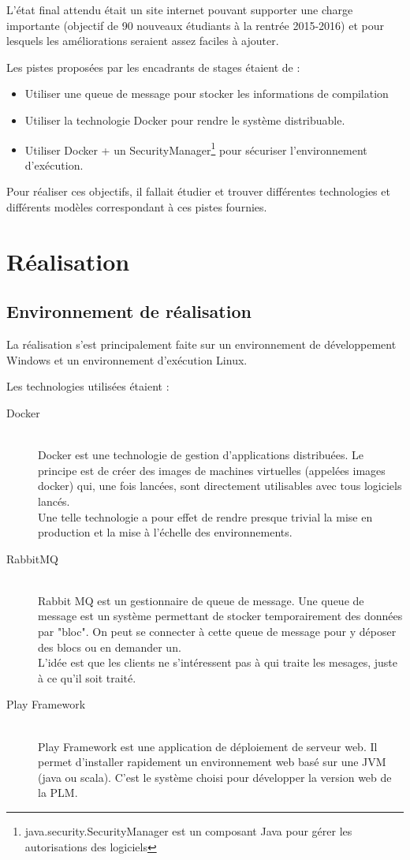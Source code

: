 \documentclass[stage]{tnreport}
\begin{document}
L'état final attendu était un site internet pouvant supporter une charge importante (objectif de 90 nouveaux étudiants à la rentrée 2015-2016) et pour lesquels les améliorations seraient assez faciles à ajouter.

Les pistes proposées par les encadrants de stages étaient de :
\begin{itemize}
	\item Utiliser une queue de message pour stocker les informations de compilation
	\item Utiliser la technologie Docker\cite{DCK-WS} pour rendre le système distribuable.
	\item Utiliser Docker + un SecurityManager\footnote{java.security.SecurityManager est un composant Java pour gérer les autorisations des logiciels} pour sécuriser l'environnement d'exécution.
\end{itemize}

Pour réaliser ces objectifs, il fallait étudier et trouver différentes technologies et différents modèles correspondant à ces pistes fournies.

\chapter{Réalisation}
\section{Environnement de réalisation}

La réalisation s'est principalement faite sur un environnement de développement Windows et un environnement d'exécution Linux.

Les technologies utilisées étaient :
\begin{description}
	\item[Docker] \hfill \\
		Docker est une technologie de gestion d'applications distribuées. Le principe est de créer des images de machines virtuelles (appelées images docker) qui, une fois lancées, sont directement utilisables avec tous logiciels lancés. \\
		Une telle technologie a pour effet de rendre presque trivial la mise en production et la mise à l'échelle des environnements.
	\item[RabbitMQ] \hfill \\
		Rabbit MQ\cite{RMQ-WS} est un gestionnaire de queue de message. Une queue de message est un  système permettant de stocker temporairement des données par "bloc". On peut se connecter à cette queue de message pour y déposer des blocs ou en demander un. \\
		L'idée est que les clients ne s'intéressent pas à qui traite les mesages, juste à ce qu'il soit traité.
	\item[Play Framework] \hfill \\
		Play Framework\cite{PFM-WS} est une application de déploiement de serveur web. Il permet d'installer rapidement un environnement web basé sur une JVM (java ou scala). C'est le système choisi pour développer la version web de la PLM.
\end{description}
\end{document}
